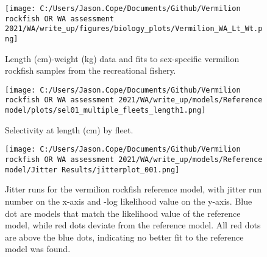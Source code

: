 \documentclass[11pt,
  english,
  a4paper,
]{article}
\begin{document}
\tagmcend\tagstructend


\begin{figure}
\centering
\texttt{[image: C:/Users/Jason.Cope/Documents/Github/Vermilion rockfish OR WA assessment 2021/WA/write\_up/figures/biology\_plots/Vermilion\_WA\_Lt\_Wt.png]}
\caption{Length (cm)-weight (kg) data and fits to sex-specific vermilion rockfish samples from the recreational fishery.\label{fig:len-weight-fit}}
\end{figure}

\tagmcend\tagstructend


\begin{figure}
\centering
\texttt{[image: C:/Users/Jason.Cope/Documents/Github/Vermilion rockfish OR WA assessment 2021/WA/write\_up/models/Reference model/plots/sel01\_multiple\_fleets\_length1.png]}
\caption{Selectivity at length (cm) by fleet.\label{fig:selex}}
\end{figure}

\tagmcend\tagstructend


\begin{figure}
\centering
\texttt{[image: C:/Users/Jason.Cope/Documents/Github/Vermilion rockfish OR WA assessment 2021/WA/write\_up/models/Reference model/Jitter Results/jitterplot\_001.png]}
\caption{Jitter runs for the vermilion rockfish reference model, with jitter run number on the x-axis and -log likelihood value on the y-axis. Blue dot are models that match the likelihood value of the reference model, while red dots deviate from the reference model. All red dots are above the blue dots, indicating no better fit to the reference model was found.\label{fig:jitter_001}}
\end{figure}
\end{document}

